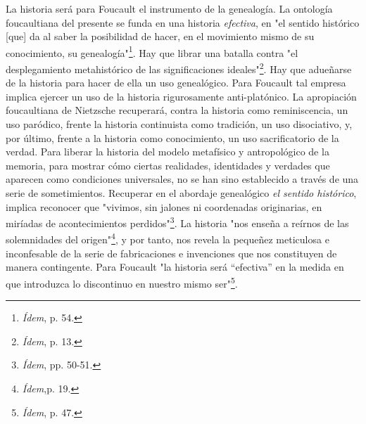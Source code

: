 La historia será para Foucault el instrumento de la genealogía. La
ontología foucaultiana del presente se funda en una historia
\emph{efectiva}, en "el sentido histórico {[}que{]} da al saber la
posibilidad de hacer, en el movimiento mismo de su conocimiento, su
genealogía"\footnote{\emph{Ídem}, p. 54.}. Hay que librar una batalla
contra "el desplegamiento metahistórico de las significaciones
ideales"\footnote{\emph{Ídem}, p. 13.}. Hay que adueñarse de la historia
para hacer de ella un uso genealógico. Para Foucault tal empresa implica
ejercer un uso de la historia rigurosamente anti-platónico. La
apropiación foucaultiana de Nietzsche recuperará, contra la historia
como reminiscencia, un uso paródico, frente la historia continuista como
tradición, un uso disociativo, y, por último, frente a la historia como
conocimiento, un uso sacrificatorio de la verdad. Para liberar la
historia del modelo metafísico y antropológico de la memoria, para
mostrar cómo ciertas realidades, identidades y verdades que aparecen
como condiciones universales, no se han sino establecido a través de una
serie de sometimientos. Recuperar en el abordaje genealógico \emph{el
sentido histórico}, implica reconocer que "vivimos, sin jalones ni
coordenadas originarias, en miríadas de acontecimientos
perdidos"\footnote{\emph{Ídem}, pp. 50-51.}. La historia "nos enseña a
reírnos de las solemnidades del origen"\footnote{\emph{Ídem},p. 19.}, y
por tanto, nos revela la pequeñez meticulosa e inconfesable de la serie
de fabricaciones e invenciones que nos constituyen de manera
contingente. Para Foucault "la historia será ``efectiva'' en la medida
en que introduzca lo discontinuo en nuestro mismo ser"\footnote{\emph{Ídem},
  p. 47.}.

